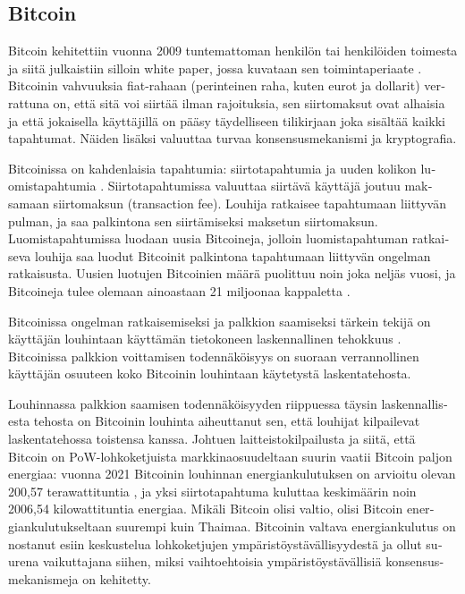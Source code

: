 \subsection{Bitcoin\label{bitcoin}}
\begin{otherlanguage}{english}

Bitcoin kehitettiin vuonna 2009 tuntemattoman henkilön tai henkilöiden toimesta ja siitä julkaistiin silloin white paper, jossa kuvataan sen toimintaperiaate \cite{bitcoin1, satoshibitcoin}. Bitcoinin vahvuuksia fiat-rahaan (perinteinen raha, kuten eurot ja dollarit) verrattuna on, että sitä voi siirtää ilman rajoituksia, sen siirtomaksut ovat alhaisia ja että jokaisella käyttäjillä on pääsy täydelliseen tilikirjaan joka sisältää kaikki tapahtumat. Näiden lisäksi valuuttaa turvaa konsensusmekanismi ja kryptografia.

Bitcoinissa on kahdenlaisia tapahtumia: siirtotapahtumia ja uuden kolikon luomistapahtumia \cite{bitcoin1}. Siirtotapahtumissa valuuttaa siirtävä käyttäjä joutuu maksamaan siirtomaksun (transaction fee). Louhija ratkaisee tapahtumaan liittyvän pulman, ja saa palkintona sen siirtämiseksi maksetun siirtomaksun. Luomistapahtumissa luodaan uusia Bitcoineja, jolloin luomistapahtuman ratkaiseva louhija saa luodut Bitcoinit palkintona tapahtumaan liittyvän ongelman ratkaisusta. Uusien luotujen Bitcoinien määrä puolittuu noin joka neljäs vuosi, ja Bitcoineja tulee olemaan ainoastaan 21 miljoonaa kappaletta \cite{satoshibitcoin}.

Bitcoinissa ongelman ratkaisemiseksi ja palkkion saamiseksi tärkein tekijä on käyttäjän louhintaan käyttämän tietokoneen laskennallinen tehokkuus \cite{bitcoin1}. Bitcoinissa palkkion voittamisen todennäköisyys on suoraan verrannollinen käyttäjän osuuteen koko Bitcoinin louhintaan käytetystä laskentatehosta.

Louhinnassa palkkion saamisen todennäköisyyden riippuessa täysin laskennallisesta tehosta on Bitcoinin louhinta aiheuttanut sen, että louhijat kilpailevat laskentatehossa toistensa kanssa. Johtuen laitteistokilpailusta ja siitä, että Bitcoin on PoW-lohkoketjuista markkinaosuudeltaan suurin vaatii Bitcoin paljon energiaa: vuonna 2021 Bitcoinin louhinnan energiankulutuksen on arvioitu olevan 200,57 terawattituntia \cite{bitcoinenergy}, ja yksi siirtotapahtuma kuluttaa keskimäärin noin 2006,54 kilowattituntia energiaa. Mikäli Bitcoin olisi valtio, olisi Bitcoin energiankulutukseltaan suurempi kuin Thaimaa. Bitcoinin valtava energiankulutus on nostanut esiin keskustelua lohkoketjujen ympäristöystävällisyydestä ja ollut suurena vaikuttajana siihen, miksi vaihtoehtoisia ympäristöystävällisiä konsensusmekanismeja on kehitetty.


\end{otherlanguage}
